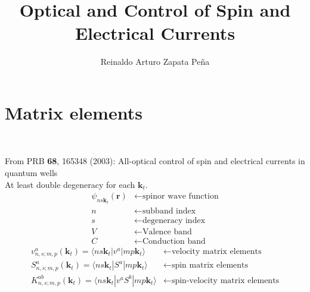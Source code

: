 \documentclass{article}
\title{Optical and Control of Spin and Electrical Currents}
\author{Reinaldo Arturo Zapata Pe\~na}
\date{}
\begin{document}
\maketitle

\section{Matrix elements}

\


From PRB \textbf{68}, 165348 (2003): All-optical control of spin and electrical
currents in quantum wells
\\

At least double degeneracy for each $\mathbf{k}_{t}$.
\begin{align}
\psi_{ns\mathbf{k}_{t}}(\mathbf{r})  & \leftarrow \text{spinor wave function} \label{eq:sp_wavefunc} \\
n & \leftarrow  \text{subband index} \nonumber \\
s & \leftarrow  \text{degeneracy index} \nonumber \\
V & \leftarrow  \text{Valence band} \nonumber \\
C & \leftarrow  \text{Conduction band} \nonumber
\end{align}
\begin{align*}
v_{n,s;m,p}^{a}(\mathbf{k}_{t}) = \langle ns\mathbf{k}_{t} | v^{a} |
mp\mathbf{k}_{t} \rangle & \leftarrow \text{velocity matrix elements}\\
S_{n,s;m,p}^{a}(\mathbf{k}_{t}) = \langle ns\mathbf{k}_{t} | S^{a} |
mp\mathbf{k}_{t} \rangle & \leftarrow \text{spin matrix elements}\\
K_{n,s;m,p}^{ab}(\mathbf{k}_{t})= \langle ns\mathbf{k}_{t} | v^{a}S^{b} |
mp\mathbf{k}_{t} \rangle & \leftarrow \text{spin-velocity matrix elements}
\end{align*}


\end{document}
